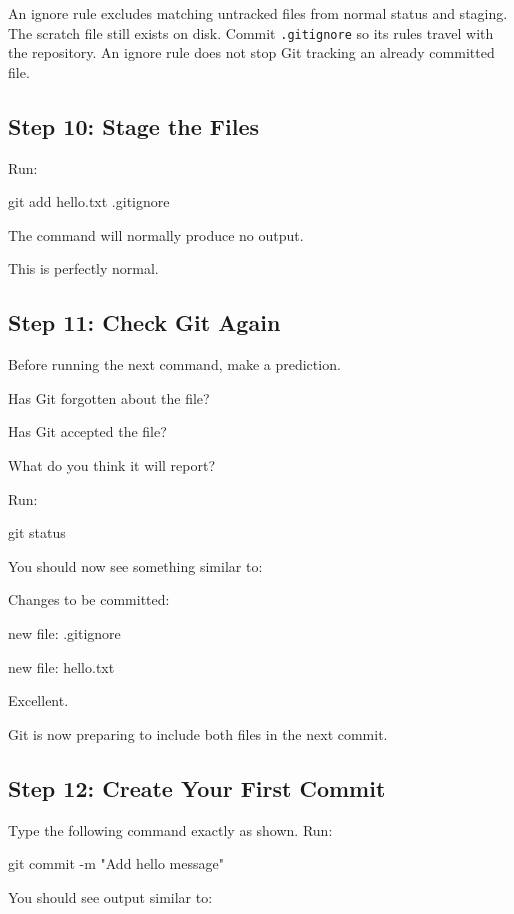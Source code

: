 \documentclass{csc2059practical}
\begin{document}
An ignore rule excludes matching untracked files from normal status and staging. The scratch file still exists on disk. Commit \texttt{.gitignore} so its rules travel with the repository. An ignore rule does not stop Git tracking an already committed file.

\subsection{Step 10: Stage the Files}
Run:

\begin{terminalplain}
git add hello.txt .gitignore
\end{terminalplain}
The command will normally produce no output.

This is perfectly normal.

\subsection{Step 11: Check Git Again}
Before running the next command, make a prediction.

Has Git forgotten about the file?

Has Git accepted the file?

What do you think it will report?

Run:

\begin{terminalplain}
git status
\end{terminalplain}
You should now see something similar to:

\begin{terminalplain}
Changes to be committed:

\hspace{1cm}\textcolor{GitGreen}{new file: .gitignore}

\hspace{1cm}\textcolor{GitGreen}{new file: hello.txt}
\end{terminalplain}
Excellent.

Git is now preparing to include both files in the next commit.

\subsection{Step 12: Create Your First Commit}
Type the following command exactly as shown. Run:

\begin{terminalplain}
git commit -m "Add hello message"
\end{terminalplain}
You should see output similar to:
\end{document}
